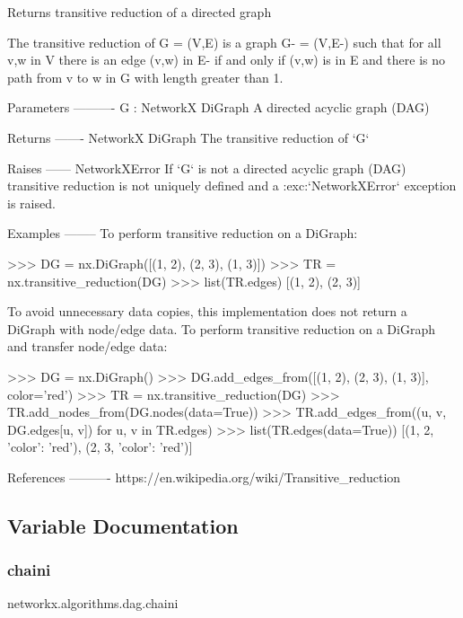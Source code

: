\begin{DoxyVerb}Returns transitive reduction of a directed graph

The transitive reduction of G = (V,E) is a graph G- = (V,E-) such that
for all v,w in V there is an edge (v,w) in E- if and only if (v,w) is
in E and there is no path from v to w in G with length greater than 1.

Parameters
----------
G : NetworkX DiGraph
    A directed acyclic graph (DAG)

Returns
-------
NetworkX DiGraph
    The transitive reduction of `G`

Raises
------
NetworkXError
    If `G` is not a directed acyclic graph (DAG) transitive reduction is
    not uniquely defined and a :exc:`NetworkXError` exception is raised.

Examples
--------
To perform transitive reduction on a DiGraph:

>>> DG = nx.DiGraph([(1, 2), (2, 3), (1, 3)])
>>> TR = nx.transitive_reduction(DG)
>>> list(TR.edges)
[(1, 2), (2, 3)]

To avoid unnecessary data copies, this implementation does not return a
DiGraph with node/edge data.
To perform transitive reduction on a DiGraph and transfer node/edge data:

>>> DG = nx.DiGraph()
>>> DG.add_edges_from([(1, 2), (2, 3), (1, 3)], color='red')
>>> TR = nx.transitive_reduction(DG)
>>> TR.add_nodes_from(DG.nodes(data=True))
>>> TR.add_edges_from((u, v, DG.edges[u, v]) for u, v in TR.edges)
>>> list(TR.edges(data=True))
[(1, 2, {'color': 'red'}), (2, 3, {'color': 'red'})]

References
----------
https://en.wikipedia.org/wiki/Transitive_reduction\end{DoxyVerb}
 

\subsection{Variable Documentation}
\mbox{\label{namespacenetworkx_1_1algorithms_1_1dag_ae9077dab1fc86c2cf208bff64fd4d594}} 
\subsubsection{\texorpdfstring{chaini}{chaini}}
{\footnotesize\ttfamily networkx.\+algorithms.\+dag.\+chaini}


